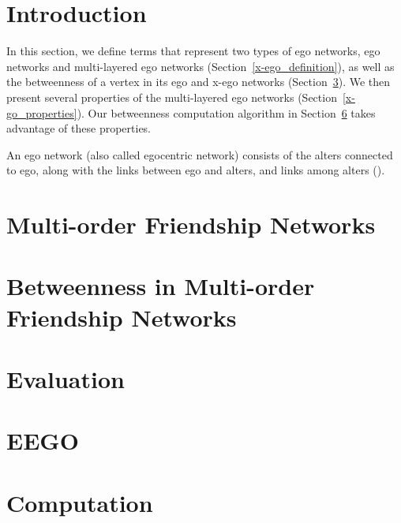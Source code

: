 \documentclass[preprint,12pt,authoryear]{elsarticle}
\theoremstyle{definition}
\begin{document}
\section{Introduction}\label{sec:introduction}
In this section, we define terms that represent two types of ego networks, ego networks and multi-layered ego networks (Section~\ref{x-ego_definition}), as well as the betweenness of a vertex in its ego and x-ego networks (Section~\ref{sec:betweenness}).
We then present several properties of the multi-layered ego networks (Section~\ref{x-go_properties}).
Our betweenness computation algorithm in Section~\ref{computation} takes advantage of these properties.

An ego network (also called egocentric network) consists of the alters connected to ego, along with the links between
ego and alters, and links among alters (\cite{ego:2018}).

\section{Multi-order Friendship Networks}\label{sec:multi-order-friendship-network}


\section{Betweenness in Multi-order Friendship Networks}\label{sec:betweenness}


\section{Evaluation}
\label{evaluation}

\section{EEGO}
\label{eego}

\section{Computation}
\label{computation}











\end{document}
